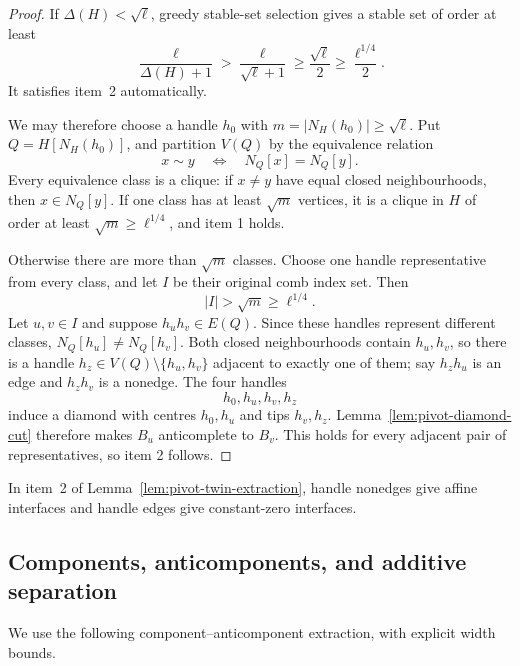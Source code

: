 \documentclass[11pt]{article}
\numberwithin{equation}{section}
\theoremstyle{plain}
\theoremstyle{definition}
\begin{document}
\begin{proof}
If $\Delta(H)<\sqrt\ell$, greedy stable-set selection gives a stable
set of order at least
\[
       \frac{\ell}{\Delta(H)+1}>\frac{\ell}{\sqrt\ell+1}
                                  \geq \frac{\sqrt\ell}{2}
                                  \geq \frac{\ell^{1/4}}{2}.
\]
It satisfies item~2 automatically.

We may therefore choose a handle $h_0$ with
$m=|N_H(h_0)|\geq\sqrt\ell$.  Put $Q=H[N_H(h_0)]$, and partition
$V(Q)$ by the equivalence relation
\[
                x\sim y\quad\Longleftrightarrow\quad
                N_Q[x]=N_Q[y].
\]
Every equivalence class is a clique: if $x\ne y$ have equal closed
neighbourhoods, then $x\in N_Q[y]$.  If one class has at least
$\sqrt m$ vertices, it is a clique in $H$ of order at least
$\sqrt m\geq\ell^{1/4}$, and item 1 holds.

Otherwise there are more than $\sqrt m$ classes.  Choose one handle
representative from every class, and let $I$ be their original comb
index set.
Then
\[
                       |I|>\sqrt m\geq\ell^{1/4}.
\]
Let $u,v\in I$ and suppose $h_uh_v\in E(Q)$.  Since these handles
represent different classes,
$N_Q[h_u]\ne N_Q[h_v]$.  Both closed neighbourhoods contain
$h_u,h_v$, so there is a handle $h_z\in
V(Q)\setminus\{h_u,h_v\}$ adjacent to exactly one of them; say
$h_zh_u$ is an edge and $h_zh_v$ is a nonedge.  The four handles
\[
                         h_0,h_u,h_v,h_z
\]
induce a diamond with centres $h_0,h_u$ and tips $h_v,h_z$.
Lemma~\ref{lem:pivot-diamond-cut} therefore makes $B_u$ anticomplete
to $B_v$.  This holds for every adjacent pair of representatives, so
item 2 follows.
\end{proof}

In item~2 of Lemma~\ref{lem:pivot-twin-extraction}, handle nonedges give
affine interfaces and handle edges give constant-zero interfaces.

\subsection{Components, anticomponents, and additive separation}

We use the following component--anticomponent extraction, with explicit
width bounds.
\end{document}
